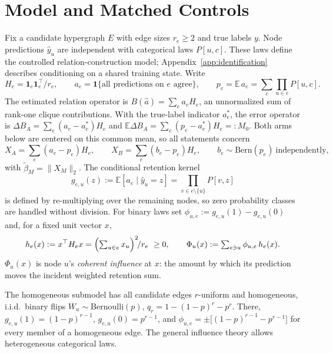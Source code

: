 \documentclass[preprint,11pt]{elsarticle}
\newcommand{\ind}[1]{\mathbf{1}\{#1\}}
\begin{document}
\section{Model and Matched Controls}\label{sec:model}

Fix a candidate hypergraph $E$ with edge sizes $r_e\ge2$ and true
labels $y$. Node predictions $\hat y_u$ are independent with
categorical laws $P[u,c]$. These laws define the controlled
relation-construction model; Appendix~\ref{app:identification}
describes conditioning on a shared training state. Write
\[
H_e=\mathbf 1_e\mathbf 1_e^\top/r_e,\qquad
a_e=\ind{\text{all predictions on }e\text{ agree}},\qquad
p_e=\mathbb E\,a_e=\sum_c\prod_{u\in e}P[u,c].
\]
The estimated relation operator is $B(\hat a)=\sum_ea_eH_e$, an
unnormalized sum of rank-one clique contributions. With the true-label
indicator $a_e^*$, the error operator is $\Delta B_A=\sum_e(a_e-a_e^*)H_e$
and $\mathbb E\Delta B_A=\sum_e(p_e-a_e^*)H_e=:M_0$. Both arms below
are centered on this common mean, so all statements concern
\[
X_A=\sum_e(a_e-p_e)H_e,\qquad
X_B=\sum_e(b_e-p_e)H_e,\qquad b_e\sim\mathrm{Bern}(p_e)
\ \text{independently,}
\]
with $\widetilde\beta_M=\|X_M\|_2$. The conditional retention kernel
\[
g_{e,u}(z):=\mathbb E[a_e\mid \hat y_u=z]
=\prod_{v\in e\setminus\{u\}}P[v,z]
\]
is defined by re-multiplying over the remaining nodes, so zero
probability classes are handled without division. For binary laws set
$\phi_{u,e}:=g_{e,u}(1)-g_{e,u}(0)$ and, for a fixed unit vector $x$,
\[
h_e(x):=x^\top H_ex=\Bigl(\textstyle\sum_{u\in e}x_u\Bigr)^2\!/r_e\ \ge0,
\qquad
\Phi_u(x):=\sum_{e\ni u}\phi_{u,e}\,h_e(x).
\]
$\Phi_u(x)$ is node $u$'s \emph{coherent influence} at $x$: the amount
by which its prediction moves the incident weighted retention sum.

The homogeneous submodel has all
candidate edges $r$-uniform and homogeneous, i.i.d.\ binary flips
$W_u\sim\mathrm{Bernoulli}(p)$, $q_r=1-(1-p)^r-p^r$. There,
$g_{e,u}(1)=(1-p)^{r-1}$, $g_{e,u}(0)=p^{r-1}$, and
$\phi_{u,e}=\pm\bigl[(1-p)^{r-1}-p^{r-1}\bigr]$ for every member of a
homogeneous edge. The general influence theory allows heterogeneous
categorical laws.
\end{document}
